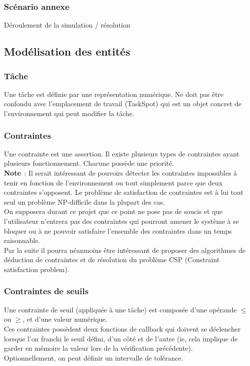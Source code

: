 \subsubsection{Scénario annexe}

Déroulement de la simulation / résolution

\subsection{Modélisation des entités}

\subsubsection*{Tâche}

Une tâche est définie par une représentation numérique. Ne doit pas être confondu avec l'emplacement de travail (TaskSpot) qui est un objet concret de l'environnement qui peut modifier la  tâche.

\subsubsection*{Contraintes}

Une contrainte est une assertion.
Il existe plusieurs types de contraintes ayant plusieurs fonctionnement. Chacune possède une priorité. \\

\textbf{Note}~: Il serait intéressant de pouvoirs détecter les contraintes impossibles à tenir en fonction de l'environnement ou tout simplement parce que deux contraintes s'opposent. Le problème de satisfaction de contraintes est à lui tout seul un problème NP-difficile dans la plupart des cas.\\
On supposera durant ce projet que ce point ne pose pas de soucis et que l'utilisateur n'entrera pas des contraintes qui pourront amener le système à se bloquer ou à ne pouvoir satisfaire l'ensemble des contraintes dans un temps raisonnable.\\
Par la suite il pourra néanmoins être intéressant de proposer des algorithmes de déduction de contraintes et de résolution du problème CSP (Constraint satisfaction problem).

\subsubsection*{Contraintes de seuils}

Une contrainte de seuil (appliquée à une tâche) est composée d'une opérande $\leq$ ou $\geq$, et d'une valeur numérique.\\
Ces contraintes possèdent deux fonctions de callback qui doivent se déclencher lorsque l'on franchi le seuil défini, d'un côté et de l'autre (ie, cela implique de garder en mémoire la valeur lors de la vérification précédente).\\
Optionnellement, on peut définir un intervalle de tolérance.

